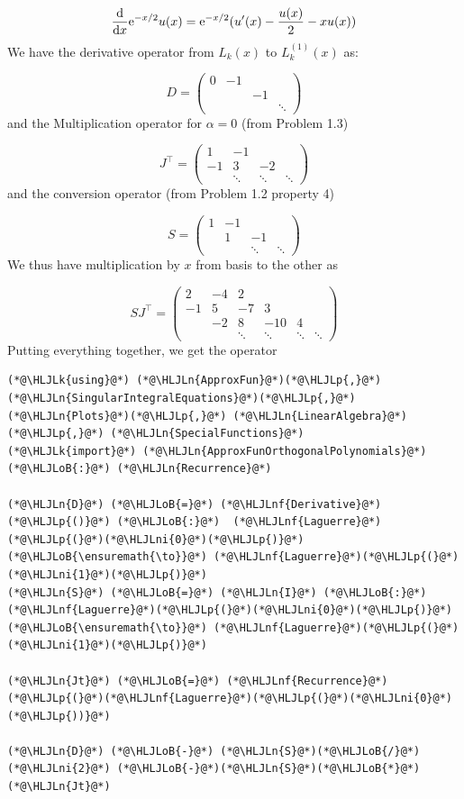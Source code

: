\documentclass[12pt,a4paper]{article}
\newcommand{\HLJLk}[1]{\textcolor[RGB]{148,91,176}{\textbf{#1}}}
\newcommand{\HLJLn}[1]{#1}
\newcommand{\HLJLnf}[1]{\textcolor[RGB]{66,102,213}{#1}}
\newcommand{\HLJLni}[1]{\textcolor[RGB]{59,151,46}{#1}}
\newcommand{\HLJLoB}[1]{\textcolor[RGB]{102,102,102}{\textbf{#1}}}
\newcommand{\HLJLp}[1]{#1}
\def\D{ {\rm d} }
\def\E{ {\rm e} }
\def\dx{\D x}
\begin{document}
\[
{\D \over \dx} \E^{-x/2} u(x)  = \E^{-x/2} (u'(x) -{u(x) \over 2} - x u(x))
\]
We have the derivative operator from $L_k(x)$ to $L_k^{(1)}(x)$ as:

\[
D = \begin{pmatrix}
0 & -1 \\
  &&-1 \\
  &&&\ddots
\end{pmatrix}
\]
and the Multiplication operator for $\alpha = 0$ (from Problem 1.3)

\[
J^\top = \begin{pmatrix} 1 &-1\\
                        -1 & 3 &-2\\
                            &\ddots & \ddots & \ddots
                            \end{pmatrix}
\]
and the conversion operator (from Problem 1.2 property 4)

\[
S = \begin{pmatrix}
        1 & -1 \\ & 1 & -1 \\&&\ddots & \ddots
\end{pmatrix}        
\]
We thus have multiplication by $x$ from basis to the other as

\[
S J^\top = \begin{pmatrix}
2 & -4 & 2 \\
-1 & 5 & -7 & 3 \\
& -2 & 8 & -10 & 4\\
&&\ddots&\ddots&\ddots&\ddots
\end{pmatrix}
\]
Putting everything together, we get the operator


\begin{lstlisting}
(*@\HLJLk{using}@*) (*@\HLJLn{ApproxFun}@*)(*@\HLJLp{,}@*) (*@\HLJLn{SingularIntegralEquations}@*)(*@\HLJLp{,}@*) (*@\HLJLn{Plots}@*)(*@\HLJLp{,}@*) (*@\HLJLn{LinearAlgebra}@*)(*@\HLJLp{,}@*) (*@\HLJLn{SpecialFunctions}@*)
(*@\HLJLk{import}@*) (*@\HLJLn{ApproxFunOrthogonalPolynomials}@*)(*@\HLJLoB{:}@*) (*@\HLJLn{Recurrence}@*)

(*@\HLJLn{D}@*) (*@\HLJLoB{=}@*) (*@\HLJLnf{Derivative}@*)(*@\HLJLp{()}@*) (*@\HLJLoB{:}@*)  (*@\HLJLnf{Laguerre}@*)(*@\HLJLp{(}@*)(*@\HLJLni{0}@*)(*@\HLJLp{)}@*) (*@\HLJLoB{\ensuremath{\to}}@*) (*@\HLJLnf{Laguerre}@*)(*@\HLJLp{(}@*)(*@\HLJLni{1}@*)(*@\HLJLp{)}@*)
(*@\HLJLn{S}@*) (*@\HLJLoB{=}@*) (*@\HLJLn{I}@*) (*@\HLJLoB{:}@*) (*@\HLJLnf{Laguerre}@*)(*@\HLJLp{(}@*)(*@\HLJLni{0}@*)(*@\HLJLp{)}@*) (*@\HLJLoB{\ensuremath{\to}}@*) (*@\HLJLnf{Laguerre}@*)(*@\HLJLp{(}@*)(*@\HLJLni{1}@*)(*@\HLJLp{)}@*)

(*@\HLJLn{Jt}@*) (*@\HLJLoB{=}@*) (*@\HLJLnf{Recurrence}@*)(*@\HLJLp{(}@*)(*@\HLJLnf{Laguerre}@*)(*@\HLJLp{(}@*)(*@\HLJLni{0}@*)(*@\HLJLp{))}@*)

(*@\HLJLn{D}@*) (*@\HLJLoB{-}@*) (*@\HLJLn{S}@*)(*@\HLJLoB{/}@*)(*@\HLJLni{2}@*) (*@\HLJLoB{-}@*)(*@\HLJLn{S}@*)(*@\HLJLoB{*}@*)(*@\HLJLn{Jt}@*)
\end{lstlisting}
\end{document}
